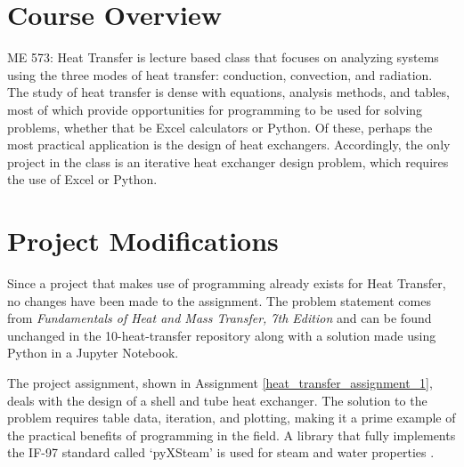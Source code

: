 \section{Course Overview}

ME 573: Heat Transfer is lecture based class that focuses on analyzing systems using
the three modes of heat transfer: conduction, convection, and radiation. The study of
heat transfer is dense with equations, analysis methods, and tables, most of which
provide opportunities for programming to be used for solving problems, whether that
be Excel calculators or Python. Of these, perhaps the most practical application 
is the design of heat exchangers. Accordingly, the only project in the class is an 
iterative heat exchanger design problem, which requires the use of Excel or Python.

\section{Project Modifications}

Since a project that makes use of programming already exists for Heat Transfer, no
changes have been made to the assignment. The problem statement comes from 
\textit{Fundamentals of Heat and Mass Transfer, 7th Edition} \cite{heat-transfer} and 
can be found unchanged in the 10-heat-transfer repository along with a solution made 
using Python in a Jupyter Notebook.

The project assignment, shown in Assignment \ref{heat_transfer_assignment_1}, deals 
with the design of a shell and tube heat exchanger. The solution to the problem requires
table data, iteration, and plotting, making it a prime example of the practical benefits
of programming in the field. A library that fully implements the IF-97 standard called
`pyXSteam' is used for steam and water properties \cite{pyxsteam2020}.

\label{heat_transfer_assignment_1}

